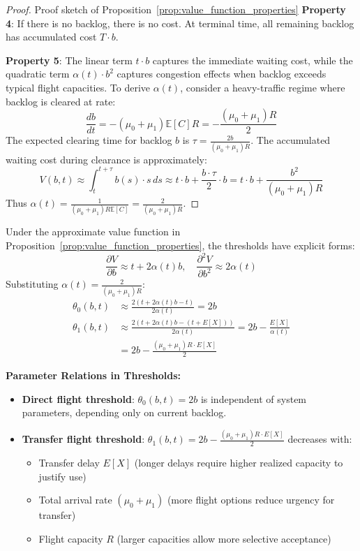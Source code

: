 \documentclass[opre,sglanonrev]{informs4}
\begin{document}
{\begin{proof}{Proof sketch of Proposition~\ref{prop:value_function_properties}}
\textbf{Property 4}: If there is no backlog, there is no cost. At terminal time, all remaining backlog has accumulated cost \( T \cdot b \).

\textbf{Property 5}: The linear term \( t \cdot b \) captures the immediate waiting cost, while the quadratic term \( \alpha(t) \cdot b^2 \) captures congestion effects when backlog exceeds typical flight capacities. To derive \( \alpha(t) \), consider a heavy-traffic regime where backlog is cleared at rate:
\[
\frac{db}{dt} = -(\mu_0 + \mu_1) \mathbb{E}[C] R = -\frac{(\mu_0 + \mu_1) R}{2}
\]
The expected clearing time for backlog \( b \) is \( \tau = \frac{2b}{(\mu_0 + \mu_1) R} \). The accumulated waiting cost during clearance is approximately:
\[
V(b, t) \approx \int_t^{t+\tau} b(s) \cdot s \, ds \approx t \cdot b + \frac{b \cdot \tau}{2} \cdot b = t \cdot b + \frac{b^2}{(\mu_0 + \mu_1) R}
\]
Thus \( \alpha(t) = \frac{1}{(\mu_0 + \mu_1) R \mathbb{E}[C]} = \frac{2}{(\mu_0 + \mu_1) R} \).
\end{proof}

\begin{corollary}
\label{cor:threshold_expressions}
Under the approximate value function in Proposition~\ref{prop:value_function_properties}, the thresholds have explicit forms:
\[
\frac{\partial V}{\partial b} \approx t + 2\alpha(t) b, \quad \frac{\partial^2 V}{\partial b^2} \approx 2\alpha(t)
\]
Substituting \( \alpha(t) = \frac{2}{(\mu_0 + \mu_1) R} \):
\begin{align}
\theta_0(b, t) &\approx \frac{2(t + 2\alpha(t) b - t)}{2\alpha(t)} = 2b \label{eq:theta0_explicit} \\
\theta_1(b, t) &\approx \frac{2(t + 2\alpha(t) b - (t + E[X]))}{2\alpha(t)} = 2b - \frac{E[X]}{\alpha(t)} \nonumber \\
&= 2b - \frac{(\mu_0 + \mu_1) R \cdot E[X]}{2} \label{eq:theta1_explicit}
\end{align}

\textbf{Parameter Relations in Thresholds:}
\begin{itemize}
    \item \textbf{Direct flight threshold}: \( \theta_0(b, t) = 2b \) is independent of system parameters, depending only on current backlog.
    
    \item \textbf{Transfer flight threshold}: \( \theta_1(b, t) = 2b - \frac{(\mu_0 + \mu_1) R \cdot E[X]}{2} \) decreases with:
    \begin{itemize}
        \item Transfer delay \( E[X] \) (longer delays require higher realized capacity to justify use)
        \item Total arrival rate \( (\mu_0 + \mu_1) \) (more flight options reduce urgency for transfer)
        \item Flight capacity \( R \) (larger capacities allow more selective acceptance)
    \end{itemize}
    

\end{itemize}
\end{corollary}}
\end{document}
